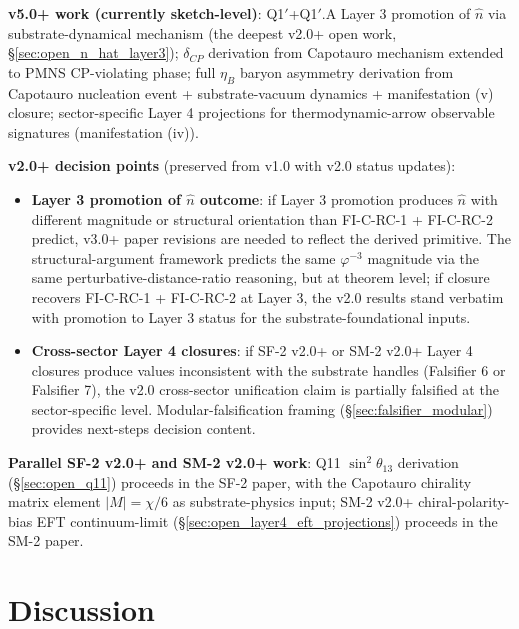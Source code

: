 \documentclass[11pt,letterpaper]{article}
\newcommand{\phig}{\varphi}
\begin{document}
\textbf{v5.0+ work (currently sketch-level)}: Q1$'$+Q1$'$.A Layer 3 promotion of $\hat{n}$ via substrate-dynamical mechanism (the deepest v2.0+ open work, \S\ref{sec:open_n_hat_layer3}); $\delta_{CP}$ derivation from Capotauro mechanism extended to PMNS CP-violating phase; full $\eta_B$ baryon asymmetry derivation from Capotauro nucleation event + substrate-vacuum dynamics + manifestation (v) closure; sector-specific Layer 4 projections for thermodynamic-arrow observable signatures (manifestation (iv)).

\textbf{v2.0+ decision points} (preserved from v1.0 with v2.0 status updates):

\begin{itemize}\setlength\itemsep{0.3em}
    \item \textbf{Layer 3 promotion of $\hat{n}$ outcome}: if Layer 3 promotion produces $\hat{n}$ with different magnitude or structural orientation than FI-C-RC-1 + FI-C-RC-2 predict, v3.0+ paper revisions are needed to reflect the derived primitive. The structural-argument framework predicts the same $\phig^{-3}$ magnitude via the same perturbative-distance-ratio reasoning, but at theorem level; if closure recovers FI-C-RC-1 + FI-C-RC-2 at Layer 3, the v2.0 results stand verbatim with promotion to Layer 3 status for the substrate-foundational inputs.
    \item \textbf{Cross-sector Layer 4 closures}: if SF-2 v2.0+ or SM-2 v2.0+ Layer 4 closures produce values inconsistent with the substrate handles (Falsifier 6 or Falsifier 7), the v2.0 cross-sector unification claim is partially falsified at the sector-specific level. Modular-falsification framing (\S\ref{sec:falsifier_modular}) provides next-steps decision content.
\end{itemize}

\textbf{Parallel SF-2 v2.0+ and SM-2 v2.0+ work}: Q11 $\sin^2\theta_{13}$ derivation (\S\ref{sec:open_q11}) proceeds in the SF-2 paper, with the Capotauro chirality matrix element $|M| = \chi/6$ as substrate-physics input; SM-2 v2.0+ chiral-polarity-bias EFT continuum-limit (\S\ref{sec:open_layer4_eft_projections}) proceeds in the SM-2 paper.

\section{Discussion}\label{sec:discussion}
\end{document}
